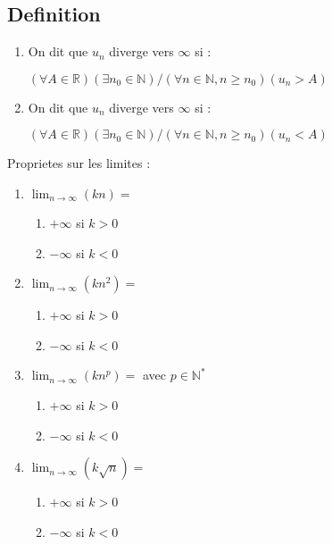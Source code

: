 \documentclass[a4paper,10pt]{book}
\begin{document}
	\subsection{Definition}
	\label{sub:Definition}

	\begin{prop}
		\begin{enumerate}
			\item On dit que $u_n$ diverge vers $\infty$ si : \begin{center}$(\forall A \in \mathbb{R})(\exists n_0 \in \mathbb{N}) / (\forall n \in \mathbb{N}, n \geq n_0)(u_n > A)$\end{center}
			\item On dit que $u_n$ diverge vers $\infty$ si : \begin{center}$(\forall A \in \mathbb{R})(\exists n_0 \in \mathbb{N}) / (\forall n \in \mathbb{N}, n \geq n_0)(u_n < A)$\end{center}
		\end{enumerate}
	\end{prop}

	\begin{prop}Proprietes sur les limites :\\
		\begin{enumerate}
			\item $\lim_{n \rightarrow \infty}(kn) =$ \begin{enumerate}\item $+ \infty$ si $k > 0$ \item $- \infty$ si $k < 0$\end{enumerate}
			\item $\lim_{n \rightarrow \infty}(kn^2) =$ \begin{enumerate}\item $+ \infty$ si $k > 0$ \item $- \infty$ si $k < 0$\end{enumerate}
			\item $\lim_{n \rightarrow \infty}(kn^p) =$ avec $p \in \mathbb{N}^*$ \begin{enumerate}\item $+ \infty$ si $k > 0$ \item $- \infty$ si $k < 0$\end{enumerate}
			\item $\lim_{n \rightarrow \infty}(k\sqrt{n}) =$ \begin{enumerate}\item $+ \infty$ si $k > 0$ \item $- \infty$ si $k < 0$\end{enumerate}
		\end{enumerate}
	\end{prop}
\end{document}
